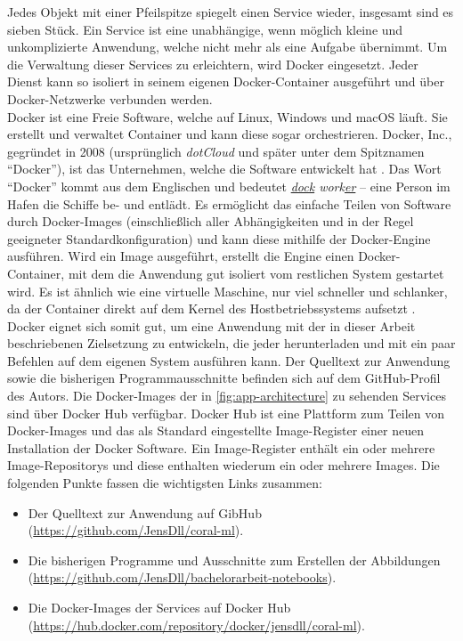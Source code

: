 \noindent
Jedes Objekt mit einer Pfeilspitze spiegelt einen Service wieder, insgesamt sind
es sieben Stück. Ein Service ist eine unabhängige, wenn möglich kleine und
unkomplizierte Anwendung, welche nicht mehr als eine Aufgabe übernimmt.
Um die Verwaltung dieser Services zu erleichtern, wird Docker eingesetzt.
Jeder Dienst kann so isoliert in seinem eigenen Docker-Container ausgeführt
und über Docker-Netzwerke verbunden werden.\\[8pt]
Docker ist eine Freie Software, welche auf Linux, Windows und macOS
läuft. Sie erstellt und verwaltet Container
und kann diese sogar orchestrieren.
Docker, Inc., gegründet in 2008 (ursprünglich \textit{dotCloud} und später unter
dem Spitznamen \enquote{Docker}), ist das Unternehmen,
welche die Software entwickelt hat \parencite{onlide:docker-inc}.
Das Wort \enquote{Docker} kommt aus dem Englischen
und bedeutet \textit{\underline{dock} work\underline{er}} --
eine Person im Hafen die Schiffe be- und entlädt.
Es ermöglicht das einfache Teilen von Software
durch Docker-Images (einschließlich aller Abhängigkeiten
und in der Regel geeigneter Standardkonfiguration) und kann
diese mithilfe der Docker-Engine ausführen.
Wird ein Image ausgeführt, erstellt die Engine einen Docker-Container,
mit dem die Anwendung gut isoliert vom restlichen System gestartet wird.
Es ist ähnlich wie eine virtuelle Maschine,
nur viel schneller und schlanker, 
da der Container direkt auf dem Kernel des Hostbetriebssystems aufsetzt
\parencite[11-14]{book:docker-dd} \parencite[672]{book:hands-on-ml}.\\[8pt]
Docker eignet sich somit gut, um eine Anwendung mit der in dieser Arbeit beschriebenen
Zielsetzung zu entwickeln, die jeder herunterladen und mit ein paar Befehlen
auf dem eigenen System ausführen kann. Der Quelltext zur Anwendung
sowie die bisherigen Programmausschnitte
befinden sich auf dem GitHub-Profil des Autors.
Die Docker-Images der in \autoref{fig:app-architecture} zu sehenden
Services sind über Docker Hub verfügbar.
Docker Hub ist eine Plattform zum Teilen von Docker-Images und das als Standard
eingestellte Image-Register einer neuen Installation der Docker Software.
Ein Image-Register enthält ein oder mehrere Image-Repositorys
und diese enthalten wiederum ein oder mehrere Images.
Die folgenden Punkte fassen die wichtigsten Links zusammen:
\begin{itemize}
  \item Der Quelltext zur Anwendung auf GibHub
        (\url{https://github.com/JensDll/coral-ml}).
  \item Die bisherigen Programme und Ausschnitte zum Erstellen der Abbildungen
        (\url{https://github.com/JensDll/bachelorarbeit-notebooks}).
  \item Die Docker-Images der Services auf Docker Hub
        (\href{https://hub.docker.com/repository/docker/jensdll/coral-ml}
        {https://hub.docker.com/reposito\allowbreak ry/docker/jensdll/coral-ml}).
\end{itemize}


